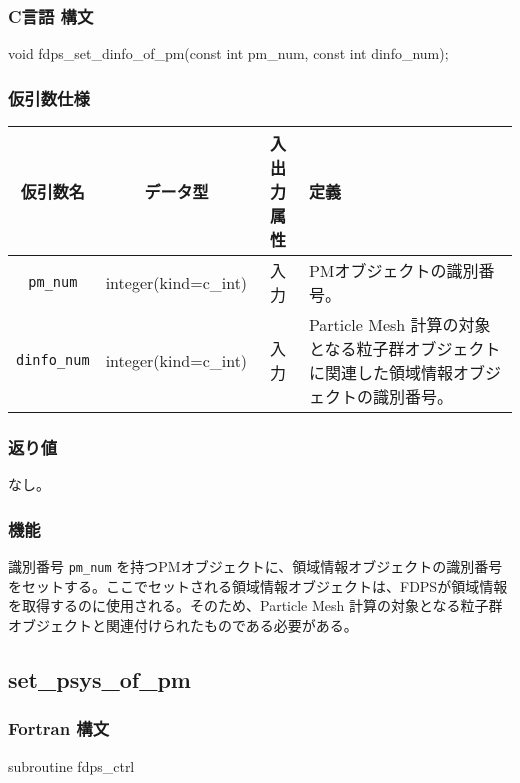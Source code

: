 \subsubsection*{C言語 構文}
\begin{screen}
\begin{spverbatim}
void fdps_set_dinfo_of_pm(const int pm_num,
                          const int dinfo_num);
\end{spverbatim}
\end{screen}

\subsubsection*{仮引数仕様}
\begin{table}[h]
\begin{tabularx}{\linewidth}{cccX}
\toprule
\rowcolor{Snow2}
仮引数名 & データ型 & 入出力属性 & 定義 \\
\midrule
\texttt{pm\_num} & integer(kind=c\_int) & 入力 & PMオブジェクトの識別番号。\\
\texttt{dinfo\_num} & integer(kind=c\_int) & 入力 & Particle Mesh 計算の対象となる粒子群オブジェクトに関連した領域情報オブジェクトの識別番号。\\
\bottomrule
\end{tabularx}
\end{table}

\subsubsection*{返り値}
なし。

\subsubsection*{機能}
識別番号 \texttt{pm\_num} を持つPMオブジェクトに、領域情報オブジェクトの識別番号をセットする。ここでセットされる領域情報オブジェクトは、FDPSが領域情報を取得するのに使用される。そのため、Particle Mesh 計算の対象となる粒子群オブジェクトと関連付けられたものである必要がある。
\clearpage

\subsection{set\_psys\_of\_pm}
\subsubsection*{Fortran 構文}
\begin{screen}
\begin{spverbatim}
subroutine fdps_ctrl%
\end{spverbatim}
\end{screen}

